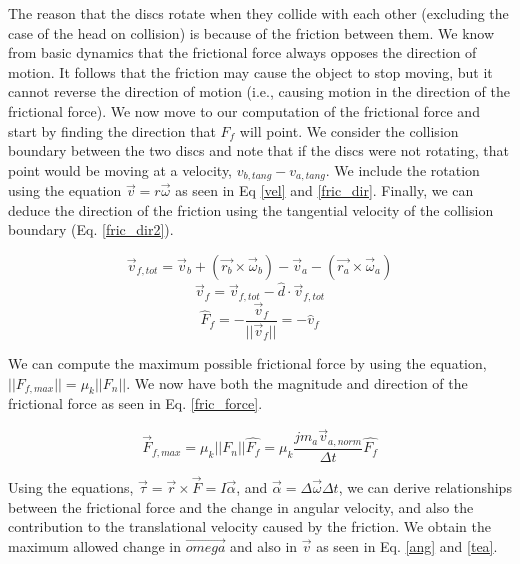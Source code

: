 \documentclass[pdftext,twoside,10pt]{article}
\begin{document}
The reason that the discs rotate when they collide with each other (excluding the case of the head on collision) is because of the friction between them. We know from basic dynamics that the frictional force always opposes the direction of motion. It follows that the friction may cause the object to stop moving, but it cannot reverse the direction of motion (i.e., causing motion in the direction of the frictional force). We now move to our computation of the frictional force and start by finding the direction that $F_f$ will point. We consider the collision boundary between the two discs and note that if the discs were not rotating, that point would be moving at a velocity, $v_{b,tang} - v_{a,tang}$. We include the rotation using the equation $\vec{v} = r\vec{\omega}$ as seen in Eq \ref{vel} and \ref{fric_dir}. Finally, we can deduce the direction of the friction using the tangential velocity of the collision boundary (Eq. \ref{fric_dir2}). 

\begin{equation}
\vec{v}_{f,tot} = \vec{v}_b + (\vec{r_b}\times\vec{\omega}_b) - \vec{v}_a - (\vec{r_a}\times\vec{\omega}_a)
 \label{vel}
\end{equation}
\begin{equation}
\vec{v}_f = \vec{v}_{f,tot} - \hat{d}\cdot\vec{v}_{f,tot}
 \label{fric_dir}
\end{equation}
\begin{equation}
\hat{F}_f = -\frac{\vec{v}_{f}}{||\vec{v}_{f}||} = -\hat{v}_f
 \label{fric_dir2}
\end{equation}

We can compute the maximum possible frictional force by using the equation, $||F_{f,max}|| = \mu_k ||F_n||$. We now have both the magnitude and direction of the frictional force as seen in Eq. \ref{fric_force}. 

\begin{equation}
\vec{F}_{f,max} = \mu_k ||F_n||\hat{F_f} = \mu_k\frac{jm_a\vec{v}_{a,norm} }{\Delta t} \hat{F_f}
 \label{fric_force}
\end{equation}

Using the equations, $\vec{\tau} = \vec{r}\times \vec{F} = I\vec{\alpha}$, and $\vec{\alpha} = \Delta\vec{\omega} \Delta t$, we can derive relationships between the frictional force and the change in angular velocity, and also the contribution to the translational velocity caused by the friction. We obtain the maximum allowed change in $\vec{omega}$ and also in $\vec{v}$ as seen in Eq. \ref{ang} and \ref{tea}.
\end{document}

